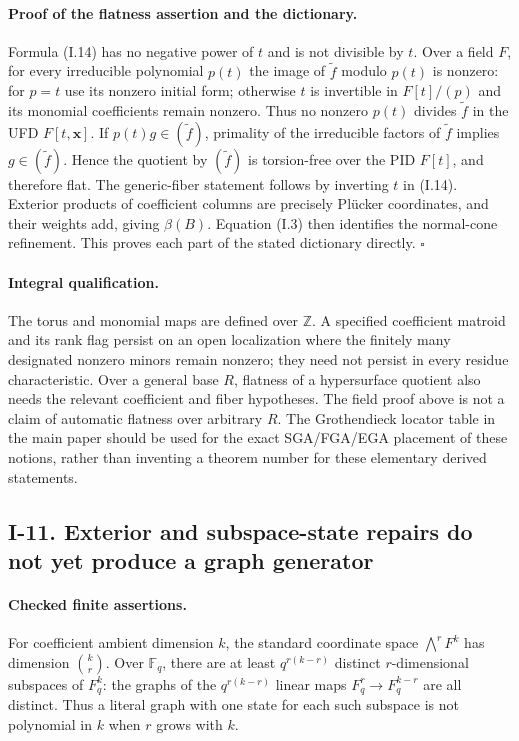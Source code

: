 \documentclass[11pt,a4paper]{article}
\theoremstyle{definition}\newtheorem{definition}{Definition}
\begin{document}
\paragraph{Proof of the flatness assertion and the dictionary.}
Formula (I.14) has no negative power of $t$ and is not divisible
by $t$.  Over a field $F$, for every irreducible polynomial
$p(t)$ the image of $\widetilde f$ modulo $p(t)$ is nonzero:
for $p=t$ use its nonzero initial form; otherwise $t$ is invertible
in $F[t]/(p)$ and its monomial coefficients remain nonzero.
Thus no nonzero $p(t)$ divides $\widetilde f$ in the UFD
$F[t,\mathbf x]$.  If $p(t)g\in(\widetilde f)$, primality of
the irreducible factors of $\widetilde f$ implies
$g\in(\widetilde f)$.  Hence the quotient by
$(\widetilde f)$ is torsion-free over the PID $F[t]$, and
therefore flat.  The generic-fiber statement follows by
inverting $t$ in (I.14).  Exterior products of coefficient
columns are precisely Pl\"ucker coordinates, and their weights
add, giving $\beta(B)$.  Equation (I.3) then identifies the
normal-cone refinement.  This proves each part of the stated
dictionary directly. \hfill$\square$

\paragraph{Integral qualification.}
The torus and monomial maps are defined over $\mathbb Z$.
A specified coefficient matroid and its rank flag persist on an
open localization where the finitely many designated nonzero
minors remain nonzero; they need not persist in every residue
characteristic.  Over a general base $R$, flatness of a
hypersurface quotient also needs the relevant coefficient and
fiber hypotheses.  The field proof above is not a claim of
automatic flatness over arbitrary $R$.  The Grothendieck locator
table in the main paper should be used for the exact SGA/FGA/EGA
placement of these notions, rather than inventing a theorem
number for these elementary derived statements.

\subsection{I-11. Exterior and subspace-state repairs do not yet produce a graph generator}
\label{I-11}

\paragraph{Checked finite assertions.}
For coefficient ambient dimension $k$, the standard coordinate
space $\bigwedge^rF^k$ has dimension $\binom kr$.  Over
$\mathbb F_q$, there are at least $q^{r(k-r)}$ distinct
$r$-dimensional subspaces of $F_q^k$: the graphs of the
$q^{r(k-r)}$ linear maps $F_q^r\to F_q^{k-r}$ are all distinct.
Thus a literal graph with one state for each such subspace is
not polynomial in $k$ when $r$ grows with $k$.
\end{document}
